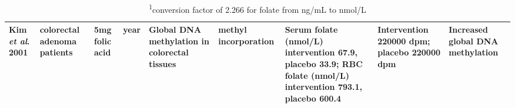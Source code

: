 \begin{sidewaystable}[hp!]
\begin{tabular}{L{1.3cm}C{1.5cm}C{1.5cm}C{1.2cm}C{1.4cm}C{1.5cm}C{2.2cm}C{2cm}C{1.8cm}}
\parbox[t][2.75cm]{1.3cm}{\raggedright Kim \textit{et al}. 2001 \cite{c440}} &
\parbox[t][2.75cm]{1.5cm}{ colorectal adenoma patients} &
\parbox[t][2.75cm]{1.5cm}{\centering 5mg folic acid} &
\parbox[t][2.75cm]{1.2cm}{ year} &
\parbox[t][2.75cm]{1.4cm}{\centering Global DNA methylation in colorectal tissues} &
\parbox[t][2.75cm]{1.5cm}{\centering [\textsuperscript{3}H] methyl incorporation} &
\parbox[t][2.75cm]{2.2cm}{\centering Serum folate (nmol/L) intervention 67.9, placebo 33.9; RBC folate (nmol/L) intervention 793.1, placebo 600.4} &
\parbox[t][2.75cm]{2.0cm}{\centering Intervention 220000 dpm; placebo 220000 dpm} &
\parbox[t][2.75cm]{1.8cm}{\centering Increased global DNA methylation}\\
\hline
\end{tabular}
\caption*{\footnotesize{\textsuperscript{1}conversion factor of 2.266 for folate from ng/mL to nmol/L}}
\end{sidewaystable}

